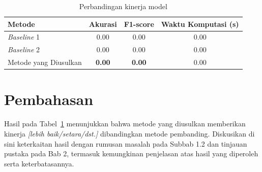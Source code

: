 \begin{table}[H]
\centering
\caption{Perbandingan kinerja model}
\label{tab:hasil-perbandingan}
\begin{tabular}{|l|c|c|c|}
\hline
Metode & Akurasi & F1-score & Waktu Komputasi (s) \\
\hline
\textit{Baseline} 1 & 0.00 & 0.00 & 0.00 \\
\hline
\textit{Baseline} 2 & 0.00 & 0.00 & 0.00 \\
\hline
Metode yang Diusulkan & \textbf{0.00} & \textbf{0.00} & 0.00 \\
\hline
\end{tabular}
\end{table}

\section{Pembahasan}
Hasil pada Tabel~\ref{tab:hasil-perbandingan} menunjukkan bahwa metode yang diusulkan memberikan kinerja \textit{[lebih baik/setara/dst.]} dibandingkan metode pembanding. Diskusikan di sini keterkaitan hasil dengan rumusan masalah pada Subbab 1.2 dan tinjauan pustaka pada Bab 2, termasuk kemungkinan penjelasan atas hasil yang diperoleh serta keterbatasannya.
